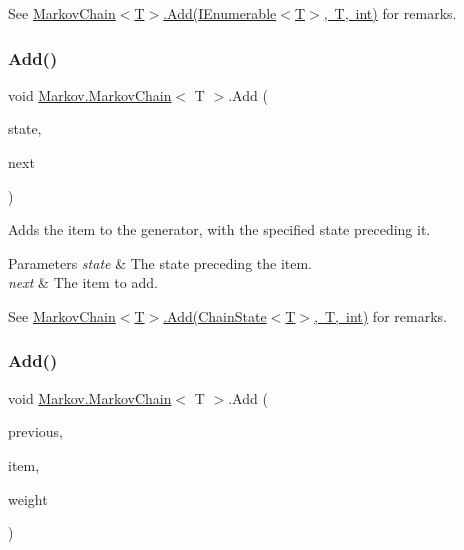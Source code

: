 See \mbox{\hyperlink{class_markov_1_1_markov_chain_a3462f45546eaa3fd7c9592ca022a9ac6}{Markov\+Chain$<$\+T$>$.\+Add(\+I\+Enumerable$<$\+T$>$, T, int)}} for remarks. \mbox{\label{class_markov_1_1_markov_chain_a70cf0423ef0109be16558b0765ec834d}} 
\subsubsection{\texorpdfstring{Add()}{Add()}\hspace{0.1cm}{\footnotesize\ttfamily [4/6]}}
{\footnotesize\ttfamily void \mbox{\hyperlink{class_markov_1_1_markov_chain}{Markov.\+Markov\+Chain}}$<$ T $>$.Add (\begin{DoxyParamCaption}\item[{\mbox{\hyperlink{class_markov_1_1_chain_state}{Chain\+State}}$<$ T $>$}]{state,  }\item[{T}]{next }\end{DoxyParamCaption})}



Adds the item to the generator, with the specified state preceding it. 


\begin{DoxyParams}{Parameters}
{\em state} & The state preceding the item.\\
\hline
{\em next} & The item to add.\\
\hline
\end{DoxyParams}


See \mbox{\hyperlink{class_markov_1_1_markov_chain_acbed62418075266c64c6e63d50726192}{Markov\+Chain$<$\+T$>$.\+Add(\+Chain\+State$<$\+T$>$, T, int)}} for remarks. \mbox{\label{class_markov_1_1_markov_chain_a3462f45546eaa3fd7c9592ca022a9ac6}} 
\subsubsection{\texorpdfstring{Add()}{Add()}\hspace{0.1cm}{\footnotesize\ttfamily [5/6]}}
{\footnotesize\ttfamily void \mbox{\hyperlink{class_markov_1_1_markov_chain}{Markov.\+Markov\+Chain}}$<$ T $>$.Add (\begin{DoxyParamCaption}\item[{I\+Enumerable$<$ T $>$}]{previous,  }\item[{T}]{item,  }\item[{int}]{weight }\end{DoxyParamCaption})}



